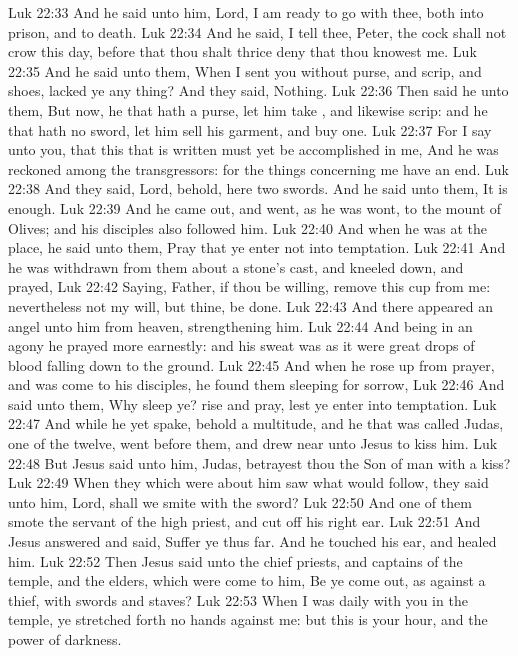 \vs Luk 22:33 And he said unto him, Lord, I am ready to go with thee, both into prison, and to death.
\vs Luk 22:34 And he said, I tell thee, Peter, the cock shall not crow this day, before that thou shalt thrice deny that thou knowest me.
\vs Luk 22:35 And he said unto them, When I sent you without purse, and scrip, and shoes, lacked ye any thing? And they said, Nothing.
\vs Luk 22:36 Then said he unto them, But now, he that hath a purse, let him take , and likewise  scrip: and he that hath no sword, let him sell his garment, and buy one.
\vs Luk 22:37 For I say unto you, that this that is written must yet be accomplished in me, And he was reckoned among the transgressors: for the things concerning me have an end.
\vs Luk 22:38 And they said, Lord, behold, here  two swords. And he said unto them, It is enough.
\vs Luk 22:39 And he came out, and went, as he was wont, to the mount of Olives; and his disciples also followed him.
\vs Luk 22:40 And when he was at the place, he said unto them, Pray that ye enter not into temptation.
\vs Luk 22:41 And he was withdrawn from them about a stone's cast, and kneeled down, and prayed,
\vs Luk 22:42 Saying, Father, if thou be willing, remove this cup from me: nevertheless not my will, but thine, be done.
\vs Luk 22:43 And there appeared an angel unto him from heaven, strengthening him.
\vs Luk 22:44 And being in an agony he prayed more earnestly: and his sweat was as it were great drops of blood falling down to the ground.
\vs Luk 22:45 And when he rose up from prayer, and was come to his disciples, he found them sleeping for sorrow,
\vs Luk 22:46 And said unto them, Why sleep ye? rise and pray, lest ye enter into temptation.
\vs Luk 22:47 And while he yet spake, behold a multitude, and he that was called Judas, one of the twelve, went before them, and drew near unto Jesus to kiss him.
\vs Luk 22:48 But Jesus said unto him, Judas, betrayest thou the Son of man with a kiss?
\vs Luk 22:49 When they which were about him saw what would follow, they said unto him, Lord, shall we smite with the sword?
\vs Luk 22:50 And one of them smote the servant of the high priest, and cut off his right ear.
\vs Luk 22:51 And Jesus answered and said, Suffer ye thus far. And he touched his ear, and healed him.
\vs Luk 22:52 Then Jesus said unto the chief priests, and captains of the temple, and the elders, which were come to him, Be ye come out, as against a thief, with swords and staves?
\vs Luk 22:53 When I was daily with you in the temple, ye stretched forth no hands against me: but this is your hour, and the power of darkness.
